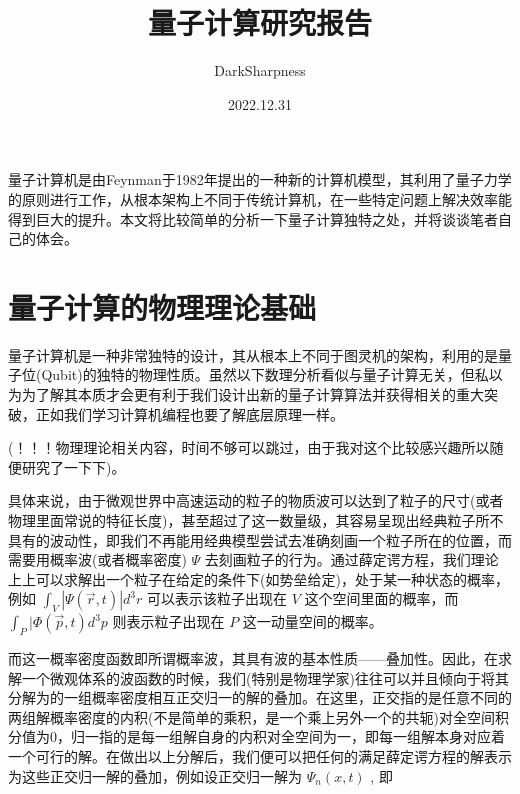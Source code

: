 \documentclass[fontset=windows]{article}
\title{\heiti\zihao{2} 量子计算研究报告}
\author{DarkSharpness}
\date{2022.12.31}
\begin{document}
	\maketitle


\tableofcontents


量子计算机是由Feynman于1982年提出的一种新的计算机模型，其利用了量子力学的原则进行工作，从根本架构上不同于传统计算机，在一些特定问题上解决效率能得到巨大的提升。本文将比较简单的分析一下量子计算独特之处，并将谈谈笔者自己的体会。

\section{量子计算的物理理论基础}

量子计算机是一种非常独特的设计，其从根本上不同于图灵机的架构，利用的是量子位(Qubit)的独特的物理性质。虽然以下数理分析看似与量子计算无关，但私以为为了解其本质才会更有利于我们设计出新的量子计算算法并获得相关的重大突破，正如我们学习计算机编程也要了解底层原理一样。

(！！！物理理论相关内容，时间不够可以跳过，由于我对这个比较感兴趣所以随便研究了一下下)。

具体来说，由于微观世界中高速运动的粒子的物质波可以达到了粒子的尺寸(或者物理里面常说的特征长度)，甚至超过了这一数量级，其容易呈现出经典粒子所不具有的波动性，即我们不再能用经典模型尝试去准确刻画一个粒子所在的位置，而需要用概率波(或者概率密度) $\Psi$ 去刻画粒子的行为。通过薛定谔方程，我们理论上上可以求解出一个粒子在给定的条件下(如势垒给定)，处于某一种状态的概率，例如 $\int_V |\Psi(\vec {r},t)| d^3r$ 可以表示该粒子出现在 $V$ 这个空间里面的概率，而 $\int_P |\Phi(\vec p,t) d^3p$ 则表示粒子出现在 $P$ 这一动量空间的概率。

而这一概率密度函数即所谓概率波，其具有波的基本性质——叠加性。因此，在求解一个微观体系的波函数的时候，我们(特别是物理学家)往往可以并且倾向于将其分解为的一组概率密度相互正交归一的解的叠加。在这里，正交指的是任意不同的两组解概率密度的内积(不是简单的乘积，是一个乘上另外一个的共轭)对全空间积分值为0，归一指的是每一组解自身的内积对全空间为一，即每一组解本身对应着一个可行的解。在做出以上分解后，我们便可以把任何的满足薛定谔方程的解表示为这些正交归一解的叠加，例如设正交归一解为 $\Psi_n(x,t)$ , 即
\end{document}
